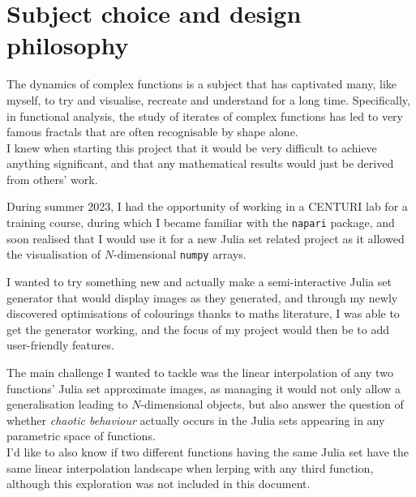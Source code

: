 \documentclass{article}
\begin{document}
\section{Subject choice and design philosophy}

The dynamics of complex functions is a subject that has captivated many, like myself, to try and visualise, recreate and understand for a long time. Specifically, in functional analysis, the study of iterates of complex functions has led to very famous fractals that are often recognisable by shape alone. \\
\vspace{2mm}
I knew when starting this project that it would be very difficult to achieve anything significant, and that any mathematical results would just be derived from others' work.
\vspace{5mm}

During summer 2023, I had the opportunity of working in a CENTURI lab for a training course, during which I became familiar with the \texttt{napari} package, and soon realised that I would use it for a new Julia set related project as it allowed the visualisation of $N$-dimensional \texttt{numpy} arrays. \\
\vspace{5mm}

I wanted to try something new and actually make a semi-interactive Julia set generator that would display images as they generated, and through my newly discovered optimisations of colourings thanks to maths literature, I was able to get the generator working, and the focus of my project would then be to add user-friendly features. \\
\vspace{5mm}

The main challenge I wanted to tackle was the linear interpolation of any two functions' Julia set approximate images, as managing it would not only allow a generalisation leading to $N$-dimensional objects, but also answer the question of whether \textit{chaotic behaviour} actually occurs in the Julia sets appearing in any parametric space of functions. \\
\vspace{2mm}
I'd like to also know if two different functions having the same Julia set \cite{Lev97} have the same linear interpolation landscape when lerping with any third function, although this exploration was not included in this document. \\
\pagebreak
\end{document}

